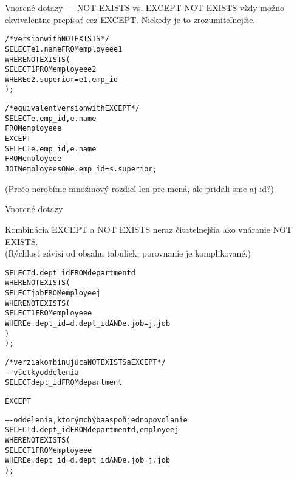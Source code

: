 \documentclass[12pt]{beamer}
\begin{document}
\begin{frame}[fragile]{Vnorené dotazy --- NOT EXISTS vs. EXCEPT}
NOT EXISTS vždy možno ekvivalentne prepísať cez \alert{EXCEPT}.
Niekedy je to zrozumiteľnejšie.
\medskip

\begin{scriptsize}
\begin{alltt}
/* version with NOT EXISTS */
SELECT e1.name FROM employee e1
WHERE NOT EXISTS (
    SELECT 1 FROM employee e2
    WHERE e2.superior = e1.emp_id
);

/* equivalent version with EXCEPT */
SELECT e.emp_id, e.name
FROM employee e
\alert{EXCEPT}
SELECT e.emp_id, e.name
FROM employee e
    JOIN employee s ON e.emp_id = s.superior;
\end{alltt}
\end{scriptsize}
\smallskip
(Prečo nerobíme množinový rozdiel len pre mená, ale pridali sme aj id?)
\end{frame}

\begin{frame}[fragile]{Vnorené dotazy}
\begin{scriptsize}
Kombinácia EXCEPT a NOT EXISTS neraz čitateľnejšia ako vnáranie NOT EXISTS.\\
(Rýchlosť závisí od obsahu tabuliek; porovnanie je komplikované.)
\medskip

\begin{alltt}
SELECT d.dept_id FROM department d
    WHERE NOT EXISTS (
      SELECT job FROM employee j
      WHERE NOT EXISTS (
          SELECT 1 FROM employee e
          WHERE e.dept_id = d.dept_id AND e.job = j.job
      )
    );

/* verzia kombinujúca NOT EXISTS a EXCEPT */
---- všetky oddelenia
SELECT dept_id FROM department

EXCEPT

---- oddelenia, ktorým chýba aspoň jedno povolanie
SELECT d.dept_id FROM department d, employee j
WHERE NOT EXISTS (
    SELECT 1 FROM employee e
    WHERE e.dept_id = d.dept_id AND e.job = j.job
);
\end{alltt}
\end{scriptsize}
\end{frame}
\end{document}
